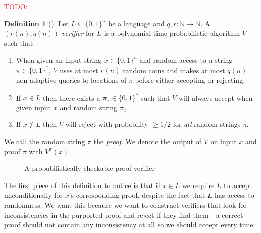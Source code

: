 \documentclass[english,12pt]{reedthesis}
\theoremstyle{plain}
\theoremstyle{definition}
\newtheorem{defn}[defn]{Definition}
\theoremstyle{remark}
\newcommand{\TODO}[1]{\textcolor{red}{TODO: #1}}
\begin{document}
\TODO{}

\begin{defn}[{\cite[Def.\ 18.1]{AB09}}]\label{def:prob-check}
  Let $L \subseteq \{0, 1\}^{n}$ be a language and $q, r\colon \mathbb{N} \rightarrow \mathbb{N}$. A
  \emph{$(r(n), q(n))$-verifier} for $L$ is a polynomial-time probabilistic
  algorithm $V$ such that
  \begin{enumerate}
    \item When given an input string $x \in \{0, 1\}^{n}$ and random access to a
          string $\pi \in \{0, 1\}^{*}$, $V$ uses at most $r(n)$ random coins and
          makes at most $q(n)$ non-adaptive queries to locations of $\pi$ before
          either accepting or rejecting.
    \item If $x \in L$ then there exists a $\pi_{x} \in \{0, 1\}^{*}$ such that $V$
          will always accept when given input $x$ and random string $\pi_{x}$.
    \item If $x \notin L$ then $V$ will reject with probability $\ge 1/2$ for
          \emph{all} random strings $\pi$.
  \end{enumerate}
  We call the random string $\pi$ the \emph{proof}. We denote the output of $V$ on
  input $x$ and proof $\pi$ with $V^{\pi}(x)$.
\end{defn}

\begin{figure}
  \centering
  \caption{A probabilistically-checkable proof verifier}\label{fig:pcp}
\end{figure}

The first piece of this definition to notice is that if $x \in L$ we require $L$
to accept unconditionally for $x$'s corresponding proof, despite the fact that
$L$ has access to randomness. We want this because we want to construct
verifiers that look for inconsistencies in the purported proof and reject if
they find them---a correct proof should not contain any inconsistency at all so we
should accept every time.
\end{document}
